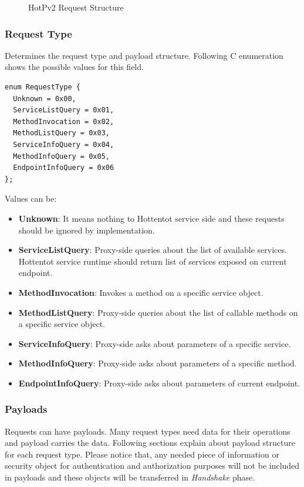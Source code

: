 \documentclass[10pt,a4paper]{article}
\begin{document}
\begin{figure}[!ht]
  \caption{HotPv2 Request Structure}
  \centering
\end{figure}

\subsubsection{Request Type}
Determines the request type and payload structure. Following C enumeration shows the possible values for this field.

\begin{verbatim}
enum RequestType { 
  Unknown = 0x00, 
  ServiceListQuery = 0x01, 
  MethodInvocation = 0x02,
  MethodListQuery = 0x03,
  ServiceInfoQuery = 0x04,
  MethodInfoQuery = 0x05,
  EndpointInfoQuery = 0x06
};
\end{verbatim}

\noindent
Values can be:
\begin{itemize}
  \item \textbf{Unknown}: It means nothing to Hottentot service side and these requests should be ignored by implementation.
  \item \textbf{ServiceListQuery}: Proxy-side queries about the list of available services. Hottentot service runtime should return list of services exposed on current endpoint.
  \item \textbf{MethodInvocation}: Invokes a method on a specific service object.
  \item \textbf{MethodListQuery}: Proxy-side queries about the list of callable methods on a specific service object.
  \item \textbf{ServiceInfoQuery}: Proxy-side asks about parameters of a specific service.
  \item \textbf{MethodInfoQuery}: Proxy-side asks about parameters of a specific method.
  \item \textbf{EndpointInfoQuery}: Proxy-side asks about parameters of current endpoint.
\end{itemize}

\subsubsection{Payloads}
Requests can have payloads. Many request types need data for their operations and payload carries the data. Following sections explain about payload structure for each request type. Please notice that, any needed piece of information or security object for authentication and authorization purposes will not be included in payloads and these objects will be transferred in \textit{Handshake} phase.
\end{document}
